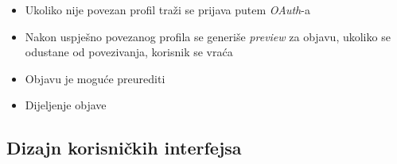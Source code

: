 \begin{itemize}
\begin{itemize}
            \item Ukoliko nije povezan profil traži se prijava putem \textit{OAuth}-a

            \item Nakon uspješno povezanog profila se generiše \textit{preview} za objavu, ukoliko se odustane od povezivanja, korisnik se vraća

            \item Objavu je moguće preurediti

            \item Dijeljenje objave
        \end{itemize}  
\end{itemize}  

\sloppy  
\subsection{Dizajn korisničkih interfejsa}  
